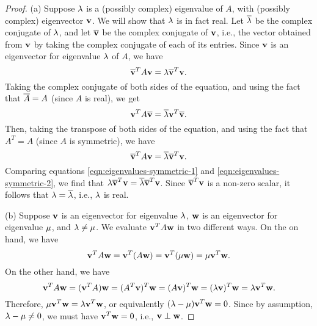 \begin{proof}
  (a) Suppose $\lambda$ is a (possibly complex) eigenvalue of $A$,
  with (possibly complex) eigenvector $\vect{v}$. We will show that
  $\lambda$ is in fact real. Let $\overline{\lambda}$ be the
  complex conjugate of $\lambda$, and let $\conjugate{\vect{v}}$ be
  the complex conjugate of $\vect{v}$, i.e., the vector obtained from
  $\vect{v}$ by taking the complex conjugate of each of its entries.
  Since $\vect{v}$ is an eigenvector for eigenvalue $\lambda$ of
  $A$, we have
  \begin{equation}\label{eqn:eigenvalues-symmetric-1}
    \conjugate{\vect{v}}^T A\vect{v}
    = \eigenvar \conjugate{\vect{v}}^T\vect{v}.
  \end{equation}
  Taking the complex conjugate of both sides of the equation, and
  using the fact that $\overline{A}=A$ (since $A$ is
  real), we get
  \begin{equation}
    \vect{v}^T A\conjugate{\vect{v}}
    = \conjugate{\eigenvar} \vect{v}^T\conjugate{\vect{v}}.
  \end{equation}
  Then, taking the transpose of both sides of the equation, and using
  the fact that $A^T=A$ (since $A$ is symmetric), we have
  \begin{equation}\label{eqn:eigenvalues-symmetric-2}
    \conjugate{\vect{v}}^T A\vect{v}
    = \conjugate{\eigenvar} \conjugate{\vect{v}}^T\vect{v}.
  \end{equation}
  Comparing equations {\eqref{eqn:eigenvalues-symmetric-1}} and
  {\eqref{eqn:eigenvalues-symmetric-2}}, we find that
  $\eigenvar \conjugate{\vect{v}}^T\vect{v} = \conjugate{\eigenvar}
  \conjugate{\vect{v}}^T\vect{v}$. Since
  $\conjugate{\vect{v}}^T\vect{v}$ is a non-zero scalar, it follows
  that $\lambda = \overline{\lambda}$, i.e., $\lambda$ is real.

  \noindent
  (b) Suppose $\vect{v}$ is an eigenvector for eigenvalue
  $\lambda$, $\vect{w}$ is an eigenvector for eigenvalue
  $\mu$, and $\lambda\neq\mu$.  We evaluate
  $\vect{v}^TA\vect{w}$ in two different ways. On the on hand, we have
  \begin{equation*}
    \vect{v}^TA\vect{w}
    = \vect{v}^T(A\vect{w})
    = \vect{v}^T(\eigenvarB\vect{w})
    = \eigenvarB \vect{v}^T\vect{w}.
  \end{equation*}
  On the other hand, we have
  \begin{equation*}
    \vect{v}^TA\vect{w}
    = (\vect{v}^TA)\vect{w}
    = (A^T\vect{v})^T\vect{w}
    = (A\vect{v})^T\vect{w}
    = (\eigenvarA\vect{v})^T\vect{w}
    = \eigenvarA\vect{v}^T\vect{w}.
  \end{equation*}
  Therefore,
  $\eigenvarB\vect{v}^T\vect{w} = \eigenvarA\vect{v}^T\vect{w}$, or
  equivalently $(\eigenvarA - \eigenvarB)\vect{v}^T\vect{w} =
  0$. Since by assumption, $\lambda - \mu\neq 0$, we must
  have $\vect{v}^T\vect{w} = 0$, i.e., $\vect{v}\orth\vect{w}$.
\end{proof}

